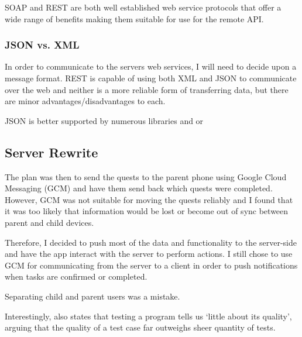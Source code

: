 SOAP and REST are both well established web service protocols that offer a wide range of benefits making them suitable for use for the remote API.


\subsubsection{JSON vs. XML}
In order to communicate to the servers web services, I will need to decide upon a message format. 
REST is capable of using both XML and JSON to communicate over the web and neither is a more reliable form of transferring data, but there are minor advantages/disadvantages to each.

JSON is better supported by numerous libraries and or







\subsection{Server Rewrite}
The plan was then to send the quests to the parent phone using Google Cloud Messaging (GCM) and have them send back which quests were completed.
However, GCM was not suitable for moving the quests reliably and I found that it was too likely that information would be lost or become out of sync between parent and child devices.

Therefore, I decided to push most of the data and functionality to the server-side and have the app interact with the server to perform actions.
I still chose to use GCM for communicating from the server to a client in order to push notifications when tasks are confirmed or completed.





Separating child and parent users was a mistake.

Interestingly, \cite{4597151} also states that testing a program tells us `little about its quality', arguing that the quality of a test case far outweighs sheer quantity of tests.

